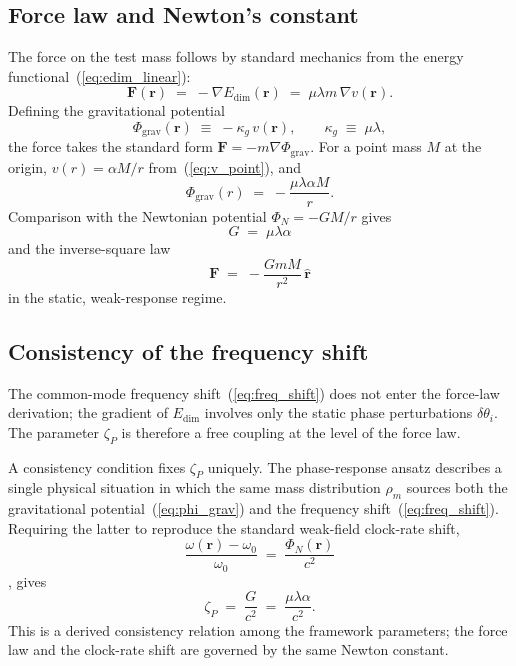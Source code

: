 \documentclass[pdflatex,sn-mathphys-num]{sn-jnl}%
\theoremstyle{thmstyleone}%
\theoremstyle{thmstyletwo}%
\theoremstyle{thmstylethree}%
\begin{document}
\subsection{Force law and Newton's constant}

The force on the test mass follows by standard mechanics from
the energy functional~(\ref{eq:edim_linear}):
\begin{equation}
    \mathbf{F}(\mathbf{r})
    \;=\;
    -\nabla E_{\mathrm{dim}}(\mathbf{r})
    \;=\;
    \mu\lambda m\,\nabla v(\mathbf{r}).
    \label{eq:force_general}
\end{equation}
Defining the gravitational potential
\begin{equation}
    \Phi_{\mathrm{grav}}(\mathbf{r})
    \;\equiv\;
    -\kappa_g\,v(\mathbf{r}),
    \qquad
    \kappa_g \;\equiv\; \mu\lambda,
    \label{eq:phi_grav}
\end{equation}
the force takes the standard form
$\mathbf{F}=-m\nabla\Phi_{\mathrm{grav}}$. For a point mass
$M$ at the origin, $v(r)=\alpha M/r$
from~(\ref{eq:v_point}), and
\begin{equation}
    \Phi_{\mathrm{grav}}(r)
    \;=\;
    -\frac{\mu\lambda\alpha M}{r}.
\end{equation}
Comparison with the Newtonian potential $\Phi_N=-GM/r$ gives
\begin{equation}
\boxed{\;
    G \;=\; \mu\lambda\alpha\;}
    \label{eq:G_identification}
\end{equation}
and the inverse-square law
\begin{equation}
    \mathbf{F}
    \;=\;
    -\frac{GmM}{r^2}\,\hat{\mathbf{r}}
\end{equation}
in the static, weak-response regime.

\subsection{Consistency of the frequency shift}

The common-mode frequency shift~(\ref{eq:freq_shift}) does not
enter the force-law derivation; the gradient of
$E_{\mathrm{dim}}$ involves only the static phase perturbations
$\delta\theta_i$. The parameter $\zeta_P$ is therefore a free
coupling at the level of the force law.

A consistency condition fixes $\zeta_P$ uniquely. The
phase-response ansatz describes a single physical situation in
which the same mass distribution $\rho_m$ sources both the
gravitational potential~(\ref{eq:phi_grav}) and the frequency
shift~(\ref{eq:freq_shift}). Requiring the latter to reproduce
the standard weak-field clock-rate shift,
\begin{equation}
    \frac{\omega(\mathbf{r})-\omega_0}{\omega_0}
    \;=\;
    \frac{\Phi_N(\mathbf{r})}{c^2}
\end{equation}
\cite{MTW1973,Chou2010,Bothwell2022}, gives
\begin{equation}
\boxed{\;
    \zeta_P\;=\;\frac{G}{c^2}\;=\;\frac{\mu\lambda\alpha}{c^2}.
\;}
    \label{eq:zeta_consistency}
\end{equation}
This is a derived consistency relation among the framework
parameters; the force law and the clock-rate shift are governed
by the same Newton constant.
\end{document}
